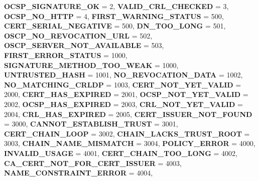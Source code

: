 \begin{DoxyCompactItemize}
{\bfseries O\+C\+S\+P\+\_\+\+S\+I\+G\+N\+A\+T\+U\+R\+E\+\_\+\+OK} = 2, 
\newline
{\bfseries V\+A\+L\+I\+D\+\_\+\+C\+R\+L\+\_\+\+C\+H\+E\+C\+K\+ED} = 3, 
{\bfseries O\+C\+S\+P\+\_\+\+N\+O\+\_\+\+H\+T\+TP} = 4, 
{\bfseries F\+I\+R\+S\+T\+\_\+\+W\+A\+R\+N\+I\+N\+G\+\_\+\+S\+T\+A\+T\+US} = 500, 
{\bfseries C\+E\+R\+T\+\_\+\+S\+E\+R\+I\+A\+L\+\_\+\+N\+E\+G\+A\+T\+I\+VE} = 500, 
\newline
{\bfseries D\+N\+\_\+\+T\+O\+O\+\_\+\+L\+O\+NG} = 501, 
{\bfseries O\+S\+C\+P\+\_\+\+N\+O\+\_\+\+R\+E\+V\+O\+C\+A\+T\+I\+O\+N\+\_\+\+U\+RL} = 502, 
{\bfseries O\+S\+C\+P\+\_\+\+S\+E\+R\+V\+E\+R\+\_\+\+N\+O\+T\+\_\+\+A\+V\+A\+I\+L\+A\+B\+LE} = 503, 
{\bfseries F\+I\+R\+S\+T\+\_\+\+E\+R\+R\+O\+R\+\_\+\+S\+T\+A\+T\+US} = 1000, 
\newline
{\bfseries S\+I\+G\+N\+A\+T\+U\+R\+E\+\_\+\+M\+E\+T\+H\+O\+D\+\_\+\+T\+O\+O\+\_\+\+W\+E\+AK} = 1000, 
{\bfseries U\+N\+T\+R\+U\+S\+T\+E\+D\+\_\+\+H\+A\+SH} = 1001, 
{\bfseries N\+O\+\_\+\+R\+E\+V\+O\+C\+A\+T\+I\+O\+N\+\_\+\+D\+A\+TA} = 1002, 
{\bfseries N\+O\+\_\+\+M\+A\+T\+C\+H\+I\+N\+G\+\_\+\+C\+R\+L\+DP} = 1003, 
\newline
{\bfseries C\+E\+R\+T\+\_\+\+N\+O\+T\+\_\+\+Y\+E\+T\+\_\+\+V\+A\+L\+ID} = 2000, 
{\bfseries C\+E\+R\+T\+\_\+\+H\+A\+S\+\_\+\+E\+X\+P\+I\+R\+ED} = 2001, 
{\bfseries O\+C\+S\+P\+\_\+\+N\+O\+T\+\_\+\+Y\+E\+T\+\_\+\+V\+A\+L\+ID} = 2002, 
{\bfseries O\+C\+S\+P\+\_\+\+H\+A\+S\+\_\+\+E\+X\+P\+I\+R\+ED} = 2003, 
\newline
{\bfseries C\+R\+L\+\_\+\+N\+O\+T\+\_\+\+Y\+E\+T\+\_\+\+V\+A\+L\+ID} = 2004, 
{\bfseries C\+R\+L\+\_\+\+H\+A\+S\+\_\+\+E\+X\+P\+I\+R\+ED} = 2005, 
{\bfseries C\+E\+R\+T\+\_\+\+I\+S\+S\+U\+E\+R\+\_\+\+N\+O\+T\+\_\+\+F\+O\+U\+ND} = 3000, 
{\bfseries C\+A\+N\+N\+O\+T\+\_\+\+E\+S\+T\+A\+B\+L\+I\+S\+H\+\_\+\+T\+R\+U\+ST} = 3001, 
\newline
{\bfseries C\+E\+R\+T\+\_\+\+C\+H\+A\+I\+N\+\_\+\+L\+O\+OP} = 3002, 
{\bfseries C\+H\+A\+I\+N\+\_\+\+L\+A\+C\+K\+S\+\_\+\+T\+R\+U\+S\+T\+\_\+\+R\+O\+OT} = 3003, 
{\bfseries C\+H\+A\+I\+N\+\_\+\+N\+A\+M\+E\+\_\+\+M\+I\+S\+M\+A\+T\+CH} = 3004, 
{\bfseries P\+O\+L\+I\+C\+Y\+\_\+\+E\+R\+R\+OR} = 4000, 
\newline
{\bfseries I\+N\+V\+A\+L\+I\+D\+\_\+\+U\+S\+A\+GE} = 4001, 
{\bfseries C\+E\+R\+T\+\_\+\+C\+H\+A\+I\+N\+\_\+\+T\+O\+O\+\_\+\+L\+O\+NG} = 4002, 
{\bfseries C\+A\+\_\+\+C\+E\+R\+T\+\_\+\+N\+O\+T\+\_\+\+F\+O\+R\+\_\+\+C\+E\+R\+T\+\_\+\+I\+S\+S\+U\+ER} = 4003, 
{\bfseries N\+A\+M\+E\+\_\+\+C\+O\+N\+S\+T\+R\+A\+I\+N\+T\+\_\+\+E\+R\+R\+OR} = 4004, 

\end{DoxyCompactItemize}
